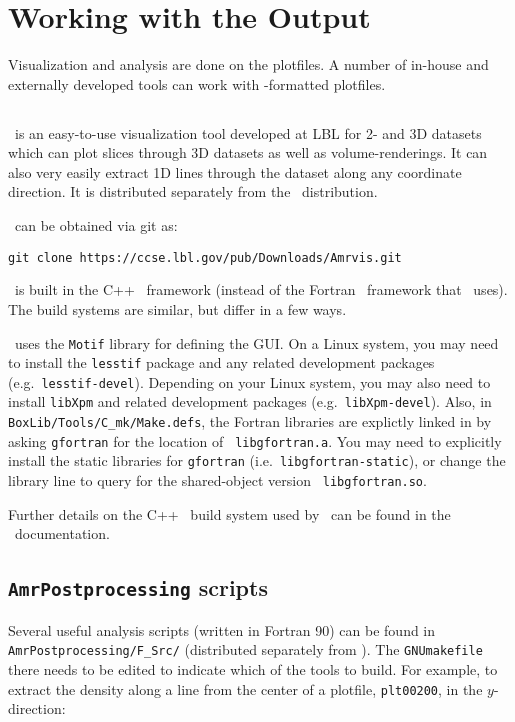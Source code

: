 \section{Working with the Output}

Visualization and analysis are done on the plotfiles.  A
number of in-house and externally developed tools can work 
with \boxlib-formatted plotfiles.


\subsection{\amrvis}

\amrvis\ is an easy-to-use visualization tool developed at LBL for
2- and 3D datasets which can plot slices through 3D datasets as well
as volume-renderings.  It can also very easily extract 1D lines
through the dataset along any coordinate direction.  It is distributed
separately from the \maestro\ distribution.

\amrvis\ can be obtained via git as:
\begin{verbatim}
git clone https://ccse.lbl.gov/pub/Downloads/Amrvis.git
\end{verbatim}
\amrvis\ is built in the C++ \boxlib\ framework (instead of the Fortran 
\boxlib\ framework that \maestro\ uses).  The build systems are similar,
but differ in a few ways.  

\amrvis\ uses the {\tt Motif} library for defining the GUI.  On a Linux 
system, you may need to install the {\tt lesstif} package and any
related development packages (e.g.\ {\tt lesstif-devel}).  Depending
on your Linux system, you may also need to install {\tt libXpm} and
related development packages (e.g.\ {\tt libXpm-devel}).  Also, in
{\tt BoxLib/Tools/C\_mk/Make.defs}, the Fortran libraries are
explictly linked in by asking {\tt gfortran} for the location of {\tt
libgfortran.a}.  You may need to explicitly install the static
libraries for {\tt gfortran} (i.e.\ {\tt libgfortran-static}), or
change the library line to query for the shared-object version {\tt
libgfortran.so}.

Further details on the C++ \boxlib\ build system used by \amrvis\
can be found in the \boxlib\ documentation.


\subsection{{\tt AmrPostprocessing} scripts}

Several useful analysis scripts (written in Fortran 90) can be found
in {\tt AmrPostprocessing/F\_Src/} (distributed separately
from \maestro).  The {\tt GNUmakefile} there needs to be edited to
indicate which of the tools to build.  For example, to extract the
density along a line from the center of a plotfile, {\tt plt00200}, in
the $y$-direction:

